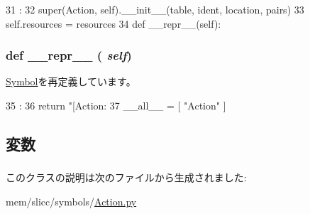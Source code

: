 \begin{DoxyCode}
31                                                               :
32     super(Action, self).__init__(table, ident, location, pairs)
33     self.resources = resources
34 
  def __repr__(self):
\end{DoxyCode}
\hypertarget{classslicc_1_1symbols_1_1Action_1_1Action_ad8b9328939df072e4740cd9a63189744}{
\subsubsection[{\_\-\_\-repr\_\-\_\-}]{\setlength{\rightskip}{0pt plus 5cm}def \_\-\_\-repr\_\-\_\- ( {\em self})}}
\label{classslicc_1_1symbols_1_1Action_1_1Action_ad8b9328939df072e4740cd9a63189744}


\hyperlink{classslicc_1_1symbols_1_1Symbol_1_1Symbol_ad8b9328939df072e4740cd9a63189744}{Symbol}を再定義しています。


\begin{DoxyCode}
35                     :
36     return "[Action: %
37 
__all__ = [ "Action" ]
\end{DoxyCode}


\subsection{変数}
\hypertarget{classslicc_1_1symbols_1_1Action_1_1Action_a715e7b31400aa585643e94e0ba160aab}{
\subsubsection[{resources}]{}}
\label{classslicc_1_1symbols_1_1Action_1_1Action_a715e7b31400aa585643e94e0ba160aab}


このクラスの説明は次のファイルから生成されました:\begin{DoxyCompactItemize}
\item 
mem/slicc/symbols/\hyperlink{Action_8py}{Action.py}\end{DoxyCompactItemize}
